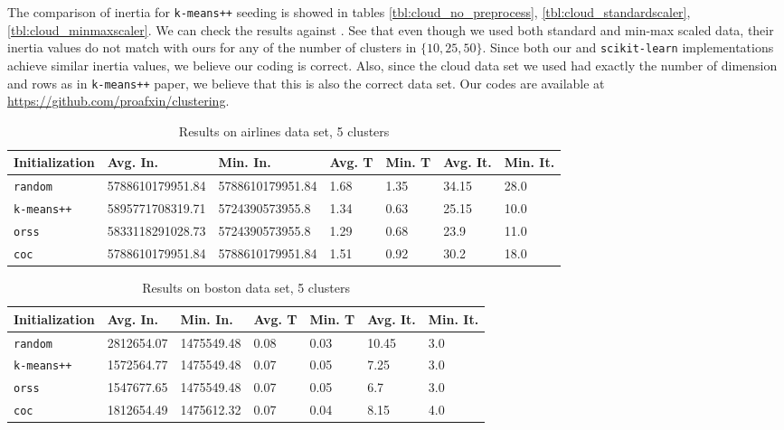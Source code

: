 \documentclass[twoside, 11pt]{article}
\begin{document}
	The comparison of inertia for \texttt{k-means++} seeding is showed in tables \ref{tbl:cloud_no_preprocess}, \ref{tbl:cloud_standardscaler}, \ref{tbl:cloud_minmaxscaler}. We can check the results against \citet[Table $3$]{kmeans++}. See that even though we used both standard and min-max scaled data, their inertia values do not match with ours for any of the number of clusters in $\{10,25,50\}$. Since both our and \texttt{scikit-learn} implementations achieve similar inertia values, we believe our coding is correct. Also, since the cloud data set we used had exactly the number of dimension and rows as in \texttt{k-means++} paper, we believe that this is also the correct data set. Our codes are available at \url{https://github.com/proafxin/clustering}.
		\begin{table}[p]
			\begin{center}
				\begin{tabular}{|l|l|l|l|l|l|l|}
					\hline
					Initialization & Avg. In. & Min. In. & Avg. T & Min. T & Avg. It. & Min. It.\\\hline
					\texttt{random} & 5788610179951.84 & 5788610179951.84 & 1.68 & 1.35 & 34.15 & 28.0\\\hline
					\texttt{k-means++} & 5895771708319.71 & 5724390573955.8 & 1.34 & 0.63 & 25.15 & 10.0\\\hline
					\texttt{orss} & 5833118291028.73 & 5724390573955.8 & 1.29 & 0.68 & 23.9 & 11.0\\\hline
					\texttt{coc} & 5788610179951.84 & 5788610179951.84 & 1.51 & 0.92 & 30.2 & 18.0\\\hline
				\end{tabular}
				\caption{Results on airlines data set, 5 clusters}
				\label{tbl:airlines5}
			\end{center}
		\end{table}
		
		\begin{table}[p]
			\begin{center}
				\begin{tabular}{|l|l|l|l|l|l|l|}
					\hline
					Initialization & Avg. In. & Min. In. & Avg. T & Min. T & Avg. It. & Min. It.\\\hline
					\texttt{random} & 2812654.07 & 1475549.48 & 0.08 & 0.03 & 10.45 & 3.0\\\hline
					\texttt{k-means++} & 1572564.77 & 1475549.48 & 0.07 & 0.05 & 7.25 & 3.0\\\hline
					\texttt{orss} & 1547677.65 & 1475549.48 & 0.07 & 0.05 & 6.7 & 3.0\\\hline
					\texttt{coc} & 1812654.49 & 1475612.32 & 0.07 & 0.04 & 8.15 & 4.0\\\hline
				\end{tabular}
				\caption{Results on boston data set, 5 clusters}
				\label{tbl:boston5}
			\end{center}
		\end{table}
		
\end{document}
